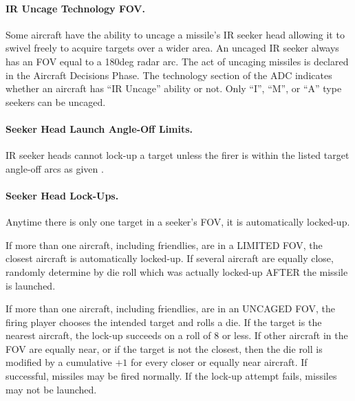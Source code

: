 \paragraph{IR Uncage Technology FOV.} \label{rule:ir-uncage} Some aircraft have the ability to uncage a missile's IR seeker head allowing it to swivel freely to acquire targets over a wider area. An uncaged IR seeker always has an FOV equal to a 180{deg} radar arc. The act of uncaging missiles is declared in the Aircraft Decisions Phase. The technology section of the ADC indicates whether an aircraft has “IR Uncage” ability or not. Only “I”, “M”, or “A” type seekers can be uncaged.



\paragraph{Seeker Head Launch Angle-Off Limits.} IR seeker heads cannot lock-up a target unless the firer is within the listed target angle-off arcs as given .


\paragraph{Seeker Head Lock-Ups.} Anytime there is only one target in a seeker's FOV, it is automatically locked-up.

If more than one aircraft, including friendlies, are in a LIMITED FOV, the closest aircraft is automatically locked-up. If several aircraft are equally close, randomly determine by die roll which was actually locked-up AFTER the missile is launched.

If more than one aircraft, including friendlies, are in an UNCAGED FOV, the firing player chooses the intended target and rolls a die. If the target is the nearest aircraft, the lock-up succeeds on a roll of 8 or less. If other aircraft in the FOV are equally near, or if the target is not the closest, then the die roll is modified by a cumulative $+1$ for every closer or equally near aircraft. If successful, missiles may be fired normally. If the lock-up attempt fails, missiles may not be launched. 

